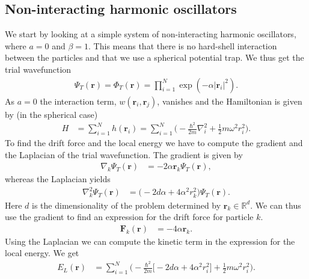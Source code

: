 \documentclass[
    a4paper, aps, twocolumn, floatfix, superscriptaddress,
    nofootinbib]{revtex4-1}
\newcommand{\vf}{\mathbf}
\newcommand{\1}{\mathds{1}}
\newcommand{\para}[1]{\left(#1\right)}
\newcommand{\half}{\frac{1}{2}}
\begin{document}
    \subsection{Non-interacting harmonic oscillators}
        We start by looking at a simple system of non-interacting harmonic
        oscillators, where $a = 0$ and $\beta = 1$. This means that there is no
        hard-shell interaction between the particles and that we use a spherical
        potential trap.  We thus get the trial  wavefunction
        \begin{align}
            \Psi_T(\vf{r})
            = \Phi_T(\vf{r})
            = \prod_{i = 1}^N \exp\para{
                -\alpha |\vf{r}_i|^2
            }.
            \label{eq:trial_simple_gaussian}
        \end{align}
        As $a = 0$ the interaction term, $w(\vf{r}_i, \vf{r}_j)$, vanishes and
        the Hamiltonian is given by (in the spherical case)
        \begin{align}
            H &= \sum_{i = 1}^N h(\vf{r}_i)
            = \sum_{i = 1}^N \Biggl(
                -\frac{\hbar^2}{2m}\nabla_i^2
                + \half m \omega^2 r_i^2
            \Biggr).
        \end{align}
        To find the drift force and the local energy we have to compute the
        gradient and the Laplacian of the trial wavefunction. The gradient is
        given by
        \begin{align}
            \nabla_k\Psi_T(\vf{r})
            &= -2\alpha \vf{r}_k\Psi_T(\vf{r}),
        \end{align}
        whereas the Laplacian yields
        \begin{align}
            \nabla^2_k\Psi_T(\vf{r})
            &= \big(-2d\alpha + 4\alpha^2 r_k^2\bigr)\Psi_T(\vf{r}).
            \label{eq:laplacian_simple_gaussian}
        \end{align}
        Here $d$ is the dimensionality of the problem determined by $\vf{r}_k
        \in \mathbb{R}^d$. We can thus use the gradient to find an expression
        for the drift force for particle $k$.
        \begin{align}
            \vf{F}_k(\vf{r})
            &= -4\alpha\vf{r}_k.
        \end{align}
        Using the Laplacian we can compute the kinetic term in the expression
        for the local energy. We get
        \begin{align}
            E_L(\vf{r})
            &=
            \sum_{i = 1}^N
            \Biggl(
                -\frac{\hbar^2}{2m}
                \bigl[
                    -2d\alpha + 4\alpha^2 r_i^2
                \bigr]
                + \half m\omega^2 r_i^2
            \Biggr).
        \end{align}
\end{document}
